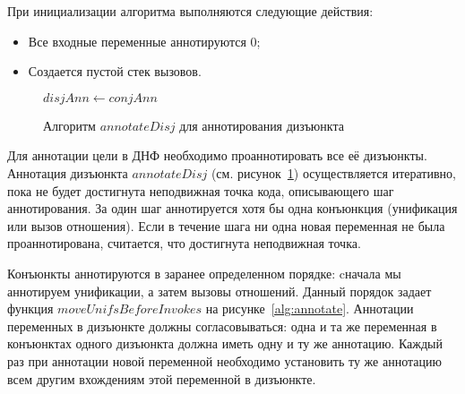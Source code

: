 При инициализации алгоритма выполняются следующие действия:
\begin{itemize}
    \item Все входные переменные аннотируются $0$;
    \item Создается пустой стек вызовов.
\end{itemize}

\begin{figure}[h!]
  \begin{center}
  \begin{minipage}{1.1\textwidth}
\begin{algorithm}[H]
   {
     {
       {
      }
       {
         {
           {
            $disjAnn \gets conjAnn$
          }
        }
      }
    }
  }
\end{algorithm}
  \end{minipage}
  \end{center}
  \caption{Алгоритм $annotateDisj$ для аннотирования дизъюнкта}
  \label{alg:annotateDisj}
\end{figure}

Для аннотации цели в ДНФ необходимо проаннотировать все её дизъюнкты.
Аннотация дизъюнкта $annotateDisj$ (см. рисунок~\ref{alg:annotateDisj}) осуществляется итеративно, пока не будет достигнута неподвижная точка кода, описывающего шаг аннотирования.
За один шаг аннотируется хотя бы одна конъюнкция (унификация или вызов отношения).
Если в течение шага ни одна новая переменная не была проаннотирована, считается, что достигнута неподвижная точка.

Конъюнкты аннотируются в заранее определенном порядке: cначала мы аннотируем унификации, а затем вызовы отношений.
Данный порядок задает функция $moveUnifsBeforeInvokes$ на рисунке~\ref{alg:annotate}.
Аннотации переменных в дизъюнкте должны согласовываться: одна и та же переменная в конъюнктах одного дизъюнкта должна иметь одну и ту же аннотацию.
Каждый раз при аннотации новой переменной необходимо установить ту же аннотацию всем другим вхождениям этой переменной в дизъюнкте.

